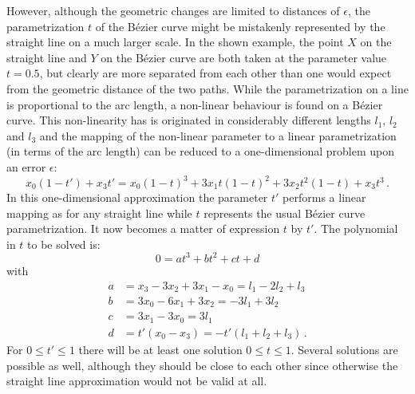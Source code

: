 \documentclass{article}
\begin{document}
However, although the geometric changes are limited to distances of
$\epsilon$, the parametrization $t$ of the B\'ezier curve might be
mistakenly represented by the straight line on a much larger scale.
In the shown example, the point $X$ on the straight line and $Y$ on
the B\'ezier curve are both taken at the parameter value $t=0.5$, but
clearly are more separated from each other than one would expect from
the geometric distance of the two paths. While the parametrization on
a line is proportional to the arc length, a non-linear behaviour is
found on a B\'ezier curve. This non-linearity has is originated in
considerably different lengths $l_1$, $l_2$ and $l_3$ and the mapping
of the non-linear parameter to a linear parametrization (in terms of
the arc length) can be reduced to a one-dimensional problem upon an
error $\epsilon$:
%
\begin{equation}
  x_0(1-t')+x_3t' = x_0(1-t)^3 + 3x_1t(1-t)^2 + 3x_2t^2(1-t) + x_3 t^3\,.
\end{equation}
%
In this one-dimensional approximation the parameter $t'$ performs a
linear mapping as for any straight line while $t$ represents the usual
B\'ezier curve parametrization. It now becomes a matter of expression
$t$ by $t'$. The polynomial in $t$ to be solved is:
%
\begin{equation}
  0 = at^3+bt^2+ct+d
\end{equation}
%
with
%
\begin{align}
  a & = x_3-3x_2+3x_1-x_0 = l_1-2l_2+l_3 \\
  b & = 3x_0-6x_1+3x_2 = -3l_1+3l_2 \\
  c & = 3x_1-3x_0 = 3l_1 \\
  d & = t'(x_0-x_3) = -t'(l_1+l_2+l_3)\,.
\end{align}
%
For $0\le t'\le1$ there will be at least one solution $0\le t\le1$.
Several solutions are possible as well, although they should be close
to each other since otherwise the straight line approximation would
not be valid at all.
\end{document}
